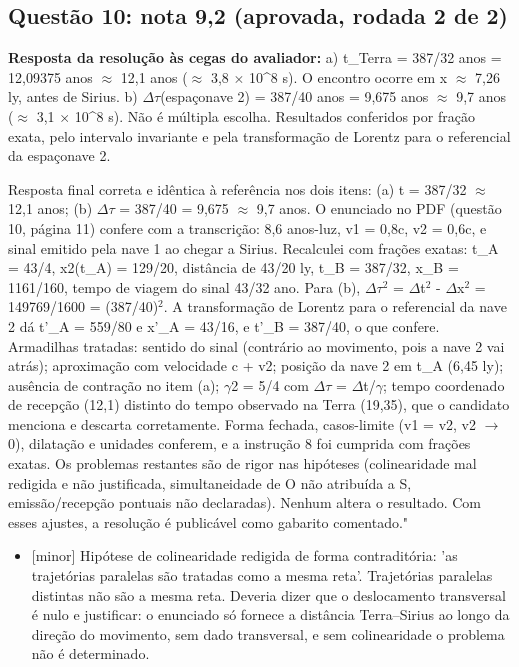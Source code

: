\documentclass{article}%
\begin{document}
\subsection*{Questão 10: nota 9,2 (aprovada, rodada 2 de 2)}%
\textbf{Resposta da resolução às cegas do avaliador:} a) t\_Terra = 387/32 anos = 12,09375 anos $\approx$ 12,1 anos ($\approx$ 3,8 $\times$ 10\^{}8 s). O encontro ocorre em x $\approx$ 7,26 ly, antes de Sirius.\newline%
\newline%
b) $\Delta$$\tau$(espaçonave 2) = 387/40 anos = 9,675 anos $\approx$ 9,7 anos ($\approx$ 3,1 $\times$ 10\^{}8 s).\newline%
\newline%
Não é múltipla escolha. Resultados conferidos por fração exata, pelo intervalo invariante e pela transformação de Lorentz para o referencial da espaçonave 2.\par %
Resposta final correta e idêntica à referência nos dois itens: (a) t = 387/32 $\approx$ 12,1 anos; (b) $\Delta$$\tau$ = 387/40 = 9,675 $\approx$ 9,7 anos. O enunciado no PDF (questão 10, página 11) confere com a transcrição: 8,6 anos{-}luz, v1 = 0,8c, v2 = 0,6c, e sinal emitido pela nave 1 ao chegar a Sirius. Recalculei com frações exatas: t\_A = 43/4, x2(t\_A) = 129/20, distância de 43/20 ly, t\_B = 387/32, x\_B = 1161/160, tempo de viagem do sinal 43/32 ano. Para (b), $\Delta$$\tau$$^2$ = $\Delta$t$^2$ - $\Delta$x$^2$ = 149769/1600 = (387/40)$^2$. A transformação de Lorentz para o referencial da nave 2 dá t'\_A = 559/80 e x'\_A = 43/16, e t'\_B = 387/40, o que confere. Armadilhas tratadas: sentido do sinal (contrário ao movimento, pois a nave 2 vai atrás); aproximação com velocidade c + v2; posição da nave 2 em t\_A (6,45 ly); ausência de contração no item (a); $\gamma$2 = 5/4 com $\Delta$$\tau$ = $\Delta$t/$\gamma$; tempo coordenado de recepção (12,1) distinto do tempo observado na Terra (19,35), que o candidato menciona e descarta corretamente. Forma fechada, casos{-}limite (v1 = v2, v2 $\to$ 0), dilatação e unidades conferem, e a instrução 8 foi cumprida com frações exatas. Os problemas restantes são de rigor nas hipóteses (colinearidade mal redigida e não justificada, simultaneidade de O não atribuída a S, emissão/recepção pontuais não declaradas). Nenhum altera o resultado. Com esses ajustes, a resolução é publicável como gabarito comentado."%
\begin{itemize}%
\item%
{[}minor{]} Hipótese de colinearidade redigida de forma contraditória: 'as trajetórias paralelas são tratadas como a mesma reta'. Trajetórias paralelas distintas não são a mesma reta. Deveria dizer que o deslocamento transversal é nulo e justificar: o enunciado só fornece a distância Terra--Sirius ao longo da direção do movimento, sem dado transversal, e sem colinearidade o problema não é determinado.%

\end{itemize}$$
\end{document}
